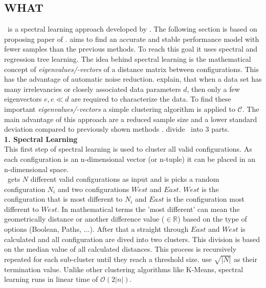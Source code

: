 \subsection{WHAT}\label{sec:WHAT}
\WHAT~is a spectral learning approach developed by \citet{FasterDiscoveryofFasterSystemConfigurationsSiegmund2017}. The following section is based on proposing paper of \citet{FasterDiscoveryofFasterSystemConfigurationsSiegmund2017}. \WHAT aims to find an accurate and stable performance model with fewer samples than the previous methods. To reach this goal it uses spectral and regression tree learning. The idea behind spectral learning is the mathematical concept of \textit{eigenvalues/-vectors} of a distance matrix between configurations. This has the advantage of automatic noise reduction.
 \citet{FasterDiscoveryofFasterSystemConfigurationsSiegmund2017} explain, that when a data set has many irrelevancies or closely associated data parameters $d$, then only a few eigenvectors $e, e\ll d$ are required to characterize the data. To find these important \textit{eigenvalues/-vectors} a simple clustering algorithm is applied to $\mathcal{C}$.
The main advantage of this approach are a reduced sample size and a lower standard deviation compared to previously shown methods \cite{FasterDiscoveryofFasterSystemConfigurationsSiegmund2017}.
\citet{FasterDiscoveryofFasterSystemConfigurationsSiegmund2017} divide \WHAT~into 3 parts.
\\

\noindent
\textbf{1. Spectral Learning}\\
\noindent
This first step of spectral learning is used to cluster all valid configurations. As each configuration is an n-dimensional vector (or n-tuple) it can be placed in an n-dimensional space.\\
\WHAT~gets $N$ different valid configurations as input and is picks a random configuration $N_i$ and two configurations $West$ and  $East$. $West$ is the configuration that is most different to $N_i$ and $East$ is the configuration most different to $West$. In mathematical terms the 'most different' can mean the geometrically distance or another difference value ($\in \mathbb{R}$) based on the type of options (Boolean, Paths, $\dots$). After that a straight through $East$ and $West$ is calculated and all configuration are dived into two clusters. This division is based on the median value of all calculated distances. This process is recursively repeated for each sub-cluster until they reach a threshold size. \citet{FasterDiscoveryofFasterSystemConfigurationsSiegmund2017} use $\sqrt{|N|}$ as their termination value. Unlike other clustering algorithms like K-Means, spectral learning runs in linear time of  $\mathcal{O}(2|n|)$.
\\

